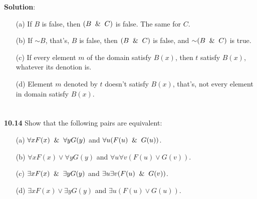 \documentclass{ctexart}
\newcommand{\unsim}{\mathord{\sim}}
\begin{document}
\textbf{Solution}:
\begin{itemize}

\item[(a)] If $B$ is false, then $(B \And C)$ is false. The same for $C$.

\item[(b)] If $\unsim B$, that's, $B$ is false, then $(B \And C)$ is false, and $\unsim(B \And C)$ is true.

\item[(c)] If every element $m$ of the domain satisfy $B(x)$, then $t$ satisfy $B(x)$, whatever its denotion
is.

\item[(d)] Element $m$ denoted by $t$ doesn't satisfy $B(x)$, that's, not every element in domain satisfy $B(x)$.

\end{itemize}

\section*{}
\textbf{10.14}
Show that the following pairs are equivalent:
\begin{itemize}
\item [(a)] $\forall x F(x) \And \forall y G(y)$ and $\forall u(F(u) \And G(u))$.
\item [(b)] $\forall x F(x) \lor \forall y G(y)$ and $\forall u\forall v(F(u) \lor G(v))$.
\item [(c)] $\exists x F(x) \And \exists y G(y)$ and $\exists u\exists v(F(u) \And G(v))$.
\item [(d)] $\exists x F(x) \lor \exists y G(y)$ and $\exists u(F(u) \lor G(u))$.
\end{itemize}
\end{document}

